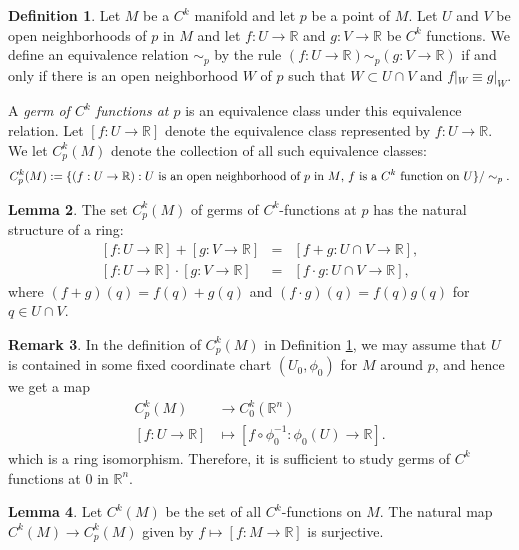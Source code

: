 \documentclass{amsart}
\numberwithin{equation}{section}
\newcommand{\bR}{\mathbb{R}}
\theoremstyle{definition}
\newtheorem{definition}{Definition} [section]
\newtheorem{remark}[definition]{Remark}
\theoremstyle{theorem}
\newtheorem{lemma}[definition]{Lemma}
\begin{document}
\begin{definition}\label{germ}
Let $M$ be a $C^k$ manifold and let $p$ be a point of $M$. Let $U$ and $V$ be open neighborhoods 
of $p$ in $M$ and let $f : U \to \bR$ and $g : V \to \mathbb{R}$ be $C^k$ functions. We define an equivalence relation $\sim_p$ by the rule 
$(f:U\to \bR) \sim_p (g:V\to \bR)$ if and only if there is an open neighborhood $W$ of $p$ such that $W\subset U\cap V$ and 
$f|_W \equiv g|_W$. 

A {\em germ of $C^k$ functions at $p$} is an equivalence class under this 
equivalence relation. Let $[f:U\to \bR]$ denote the equivalence class represented by $f:U\to \bR$.
We let $C_p^k(M)$ denote the collection of all such equivalence classes:
$$
C^k_p(M) := \{ (f:U\to \bR): U \textup{ is an open neighborhood of $p$ in $M$, $f$ is a $C^k$ function on $U$} \}/\sim_p.
$$
\end{definition}

\begin{lemma}
The set $C_p^k(M)$ of germs of $C^k$-functions at $p$ has the natural structure of a ring:
\begin{eqnarray*}
{[f:U\to \bR]+ [g:V\to \bR]} &=& [f+g:U\cap V\to \bR],\\
{[f:U\to \bR]\cdot [g:V\to \bR]} &=& [f\cdot g: U\cap V\to \bR], 
\end{eqnarray*}
where $(f+g)(q)=f(q)+g(q)$ and $(f\cdot g)(q)=f(q)g(q)$ for $q\in U\cap V$.
\end{lemma}

\begin{remark}
In the definition of $C^k_p(M)$ in Definition \ref{germ},  we may assume that $U$ is contained in some fixed coordinate chart 
$(U_0, \phi_0)$ for $M$ around $p$, and hence we get a map 
\begin{align*}
C_p^k(M) &\to C_0^k(\bR^n) \\
[f : U \to \bR] &\mapsto [f \circ \phi_0^{-1} : \phi_0 (U) \to \bR].
\end{align*}
which is a ring isomorphism. Therefore, it is sufficient to study germs of $C^k$ functions at $0$ in $\bR^n$. 
\end{remark}

\begin{lemma}
Let $C^k(M)$ be the set of all $C^k$-functions on $M$.
The natural map $C^k(M) \to C_p^k(M)$ given by $f\mapsto [f:M\to \bR]$ is surjective. 
\end{lemma}
\end{document}
